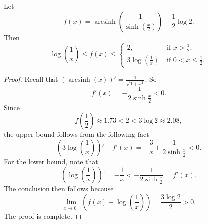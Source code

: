 \documentclass[10pt,a4paper]{amsart}
\DeclareMathOperator{\arcsinh}{arcsinh}
\begin{document}
	\begin{lemma}
		Let 
		\[
		f(x) = \arcsinh \left( \frac{1}{\sinh \left( \frac{x}{2} \right) } \right) - \frac{1}{2}\log 2.
		\]
		Then 
		\[
			\log\left(\frac{1}{x}\right) \le f(x) \le 
		\begin{cases}
			2, &\text{ if } x > \frac{1}{2}  ;\\
			3\log\left(\frac{1}{x}\right)&\text{ if }0 < x \le \frac{1}{2}.
		\end{cases}
		\]
		\label{lem:dist}
	\end{lemma}

	\begin{proof}
		Recall that $(\arcsinh(x))' = \frac{1}{\sqrt{1+x^2}}$. So  
		\[
			f'(x) = - \frac{1}{2\sinh \frac{x}{2}} <0. 
		\]
Since 
\[f\left( \frac{1}{2} \right) \approx 1.73<2<3\log 2\approx 2.08,\]
the upper bound follows from the following fact $$\left(3\log\left(\frac{1}{x}\right)\right)'-f'(x)=-\frac{3}{x}+ \frac{1}{2\sinh \frac{x}{2}}<0.$$ 
For the lower bound, note that 
		\[
			\left(\log\left(\frac{1}{x}\right)\right)' = - \frac{1}{x} <  - \frac{1}{2\sinh \frac{x}{2}} =f'(x). 
		\]
		The conclusion then follows because
        \[\lim\limits_{x\to 0^+}\left(f(x)- \log\left(\frac{1}{x}\right)\right)=\frac{3\log 2}{2}>0.\] 
        The proof is complete.
	\end{proof}
\end{document}
